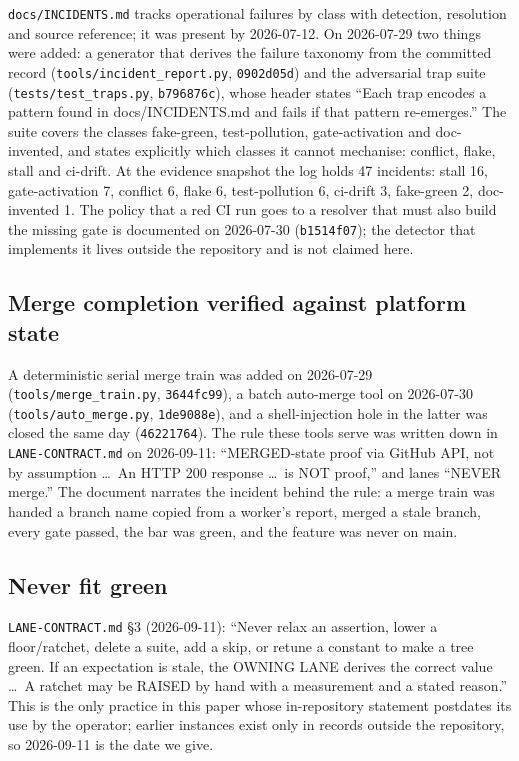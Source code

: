 \documentclass[11pt]{article}
\newcommand{\sha}[1]{\texttt{\small #1}}
\newcommand{\file}[1]{\texttt{\small #1}}
\begin{document}
\file{docs/INCIDENTS.md} tracks operational failures by class with detection, resolution and source reference; it was present by 2026-07-12. On 2026-07-29 two things were added: a generator that derives the failure taxonomy from the committed record (\file{tools/incident\_report.py}, \sha{0902d05d}) and the adversarial trap suite (\file{tests/test\_traps.py}, \sha{b796876c}), whose header states ``Each trap encodes a pattern found in docs/INCIDENTS.md and fails if that pattern re-emerges.'' The suite covers the classes fake-green, test-pollution, gate-activation and doc-invented, and states explicitly which classes it cannot mechanise: conflict, flake, stall and ci-drift. At the evidence snapshot the log holds 47 incidents: stall 16, gate-activation 7, conflict 6, flake 6, test-pollution 6, ci-drift 3, fake-green 2, doc-invented 1. The policy that a red CI run goes to a resolver that must also build the missing gate is documented on 2026-07-30 (\sha{b1514f07}); the detector that implements it lives outside the repository and is not claimed here.

\subsection{Merge completion verified against platform state}

A deterministic serial merge train was added on 2026-07-29 (\file{tools/merge\_train.py}, \sha{3644fc99}), a batch auto-merge tool on 2026-07-30 (\file{tools/auto\_merge.py}, \sha{1de9088e}), and a shell-injection hole in the latter was closed the same day (\sha{46221764}). The rule these tools serve was written down in \file{LANE-CONTRACT.md} on 2026-09-11: ``MERGED-state proof via GitHub API, not by assumption \ldots\ An HTTP 200 response \ldots\ is NOT proof,'' and lanes ``NEVER merge.'' The document narrates the incident behind the rule: a merge train was handed a branch name copied from a worker's report, merged a stale branch, every gate passed, the bar was green, and the feature was never on main.

\subsection{Never fit green}

\file{LANE-CONTRACT.md} \S3 (2026-09-11): ``Never relax an assertion, lower a floor/ratchet, delete a suite, add a skip, or retune a constant to make a tree green. If an expectation is stale, the OWNING LANE derives the correct value \ldots\ A ratchet may be RAISED by hand with a measurement and a stated reason.'' This is the only practice in this paper whose in-repository statement postdates its use by the operator; earlier instances exist only in records outside the repository, so 2026-09-11 is the date we give.
\end{document}
